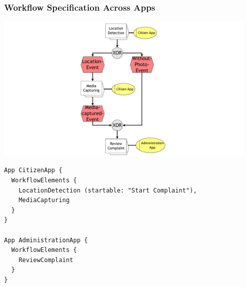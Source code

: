 
\begin{frame}
	\plainnumber
	\frametitle{Workflow Specification Across Apps}
	
	\begin{minipage}{0.45\textwidth}
	    		        \includegraphics[height = 7cm, trim = 10cm 0cm 10cm 0cm, clip = true]{images/wfAcrossApps}	  
	\end{minipage}\hfill
	\begin{minipage}{0.5\textwidth}
\begin{lstlisting}
App CitizenApp {
  WorkflowElements {
    LocationDetection (startable: "Start Complaint"),
    MediaCapturing
  }
}

App AdministrationApp {
  WorkflowElements {
    ReviewComplaint
  }
}
\end{lstlisting}
\end{minipage}

\end{frame}


